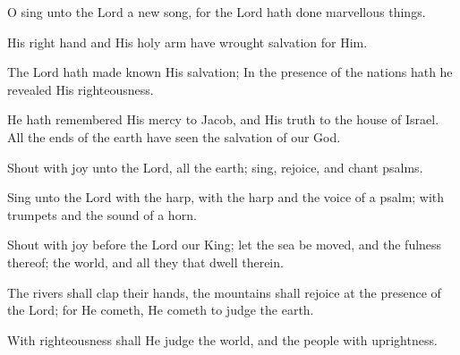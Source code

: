 O sing unto the Lord a new song, for the Lord hath done marvellous things.

His right hand and His holy arm have wrought salvation for Him.

The Lord hath made known His salvation; In the presence of the nations hath he revealed His righteousness.

He hath remembered His mercy to Jacob, and His truth to the house of Israel. All the ends of the earth have seen the salvation of our God.

Shout with joy unto the Lord, all the earth; sing, rejoice, and chant psalms.

Sing unto the Lord with the harp, with the harp and the voice of a psalm; with trumpets and the sound of a horn.

Shout with joy before the Lord our King; let the sea be moved, and the fulness thereof; the world, and all they that dwell therein.

The rivers shall clap their hands, the mountains shall rejoice at the presence of the Lord; for He cometh, He cometh to judge the earth.

With righteousness shall He judge the world, and the people with uprightness.
